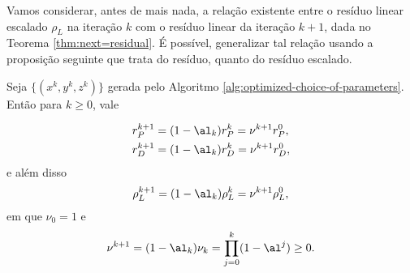 


Vamos considerar, antes de mais nada, a relação existente entre o resíduo linear escalado $\rho_L$ na iteração $k$ com o resíduo 
linear da iteração $k+1$, dada no Teorema \ref{thm:next=residual}. É possível, generalizar tal relação usando a  proposição seguinte que trata do resíduo, quanto do resíduo escalado. 
\begin{prop}\label{prop:nu_k}
 Seja $\{(x^k,y^k,z^k)\}$ gerada pelo Algoritmo \ref{alg:optimized-choice-of-parameters}. Então para $k\geq0$, vale  

\begin{equation}
\label{eq:residual-norm-relation-nonscaled}
\begin{aligned}
 r_P^{k+1}  & = (1-\alk) r_P^{k} = \nu^{k+1}  r_P^{0}, \\
  r_D^{k+1}  & = (1-\alk) r_D^{k} = \nu^{k+1}  r_D^{0}, \\
\end{aligned}
\end{equation}
e além disso
\begin{equation}
\label{eq:residual-norm-relation}
 \rho_L^{k+1}  = (1-\alk) \rho_L^{k} = \nu^{k+1}  \rho_L^{0},
\end{equation}
em que  $\nu_0 = 1$ e 
\begin{equation}
	\label{eq:nu_k+1}
\nu^{k+1} = (1-\alk)\nuk = \prod_{j=0}^{k}(1-\al^j) \geq 0.
\end{equation}
\end{prop}

